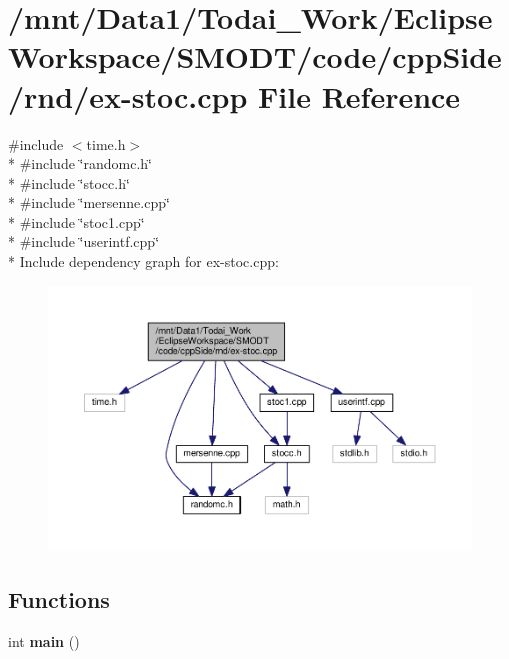 \section{/mnt/\-Data1/\-Todai\-\_\-\-Work/\-Eclipse\-Workspace/\-S\-M\-O\-D\-T/code/cpp\-Side/rnd/ex-\/stoc.cpp File Reference}
\label{rnd_2ex-stoc_8cpp}
{\ttfamily \#include $<$time.\-h$>$}\\*
{\ttfamily \#include \char`\"{}randomc.\-h\char`\"{}}\\*
{\ttfamily \#include \char`\"{}stocc.\-h\char`\"{}}\\*
{\ttfamily \#include \char`\"{}mersenne.\-cpp\char`\"{}}\\*
{\ttfamily \#include \char`\"{}stoc1.\-cpp\char`\"{}}\\*
{\ttfamily \#include \char`\"{}userintf.\-cpp\char`\"{}}\\*
Include dependency graph for ex-\/stoc.cpp\-:
\nopagebreak
\begin{figure}[H]
\begin{center}
\leavevmode
\includegraphics[width=350pt]{rnd_2ex-stoc_8cpp__incl}
\end{center}
\end{figure}
\subsection*{Functions}
\begin{DoxyCompactItemize}
\item 
int {\bf main} ()
\end{DoxyCompactItemize}


